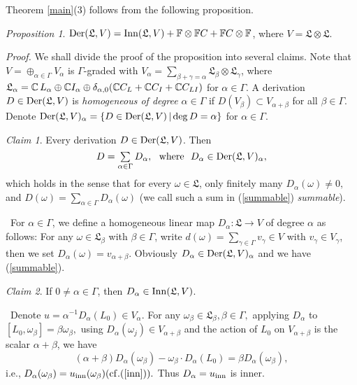 \documentclass{amsart}
\theoremstyle{definition}
\theoremstyle{remark}
\numberwithin{equation}{subsection}
\numberwithin{equation}{section}
\newtheorem{prop}[theo]{Proposition}
\newtheorem{clai}{Claim}
\begin{document}
Theorem \ref{main}(3) follows from the following proposition.

\begin{prop}
\label{lemma3} ${{\rm Der}}({\mathfrak{L}} ,V)={{\rm Inn}}({\mathfrak{L}}
,V)+\mathbb{F}\otimes \mathbb{F}C+\mathbb{F}C\otimes \mathbb{F}$,
where $V= {\mathfrak{L}} \otimes {\mathfrak{L}}$.
\end{prop}

{\noindent}{\it Proof.} We shall divide the proof of the proposition into
several claims. Note that $V=\oplus_{{\alpha}\in \Gamma}V_{\alpha}$ is
$\Gamma$-graded with $V_{\alpha}=\sum_{{\beta}+{\gamma}={\alpha}}
{\mathfrak{L}}_{\beta}\otimes{\mathfrak{L}}_{\gamma}$, where
${\mathfrak{L}}_{\alpha}={\mathbb{C}{{\scriptscriptstyle}\,}} L_{\alpha}\oplus \mathbb{C}I_\alpha\oplus
\delta_{\alpha,0}(\mathbb{C}C_L+\mathbb{C}C_I+\mathbb{C}C_{LI})$ for
${\alpha}\in \Gamma$. A derivation $D\in{{\rm Der}}({\mathfrak{L}} ,V)$ is {\it
homogeneous of degree ${\alpha}\in \Gamma$} if $D(V_{\beta}) \subset V_{{\alpha}
+{\beta}}$ for all ${\beta} \in \Gamma$. Denote ${{\rm Der}}({\mathfrak{L}} , V)_{\alpha} =
\{D\in {{\rm Der}}({\mathfrak{L}} , V) \,|\,{\rm deg\,}D ={\alpha}\}$ for ${\alpha}\in
\Gamma$.

\begin{clai}
\label{clai1} \rm Every derivation $D\in{{\rm Der}}({\mathfrak{L}} ,V)$.
Then
\begin{equation}
\label{summable} \mbox{$D = \sum\limits_{{\alpha} \in \Gamma} D_{\alpha} ,
\mbox{  \ where \ }D_{\alpha} \in {{\rm Der}}({\mathfrak{L}}, V)_{\alpha},$}
\end{equation}
which holds in the sense that for every $\omega \in {\mathfrak{L}}
$, only finitely many $D_{\alpha} (\omega)\neq 0,$ and $D(\omega) =
\sum_{{\alpha} \in \Gamma} D_{\alpha}(\omega)$ (we call such a sum in
(\ref{summable}) {\it summable}).
\end{clai}
\ \indent For ${\alpha}\in \Gamma$, we define a homogeneous linear map
$D_{\alpha} : {\mathfrak{L}}\rightarrow V$ of degree $\alpha$ as follows:
For any $\omega\in {\mathfrak{L}} _{\beta}$ with ${\beta}\in \Gamma$, write
$d(\omega)=\sum_{{\gamma}\in \Gamma}v_{\gamma}\in V$ with $v_{\gamma}\in V_{\gamma}$, then
we set $D_{\alpha}(\omega)=v_{{\alpha}+{\beta}}$. Obviously
$D_{\alpha}\in{{\rm Der}}({\mathfrak{L}} ,V)_{\alpha}$ and we have (\ref{summable}).
\begin{clai}
\label{clai2} \rm If $0\neq{\alpha}\in \Gamma$, then
$D_{\alpha}\in{{\rm Inn}}({\mathfrak{L}} ,V)$.
\end{clai}
\ \indent  Denote $u=\alpha^{-1}D_\alpha(L_0)\in V_\alpha.$ For any
$\omega_\beta\in \mathfrak{L}_\beta, \beta\in \Gamma,$  applying
$D_\alpha$ to $[L_0,\omega_\beta]=\beta \omega_\beta,$  using
$D_\alpha(\omega_j)\in V_{\alpha+\beta}$ and the action of $L_0$ on
$V_{\alpha+\beta}$ is the scalar $\alpha+\beta$, we have
\begin{equation}\label{equa-add-1}
({\alpha}+{\beta})D_{\alpha}(\omega_\beta) - \omega_\beta\cdot D_{\alpha}(L_0)={\beta}
D_{\alpha}(\omega_\beta),
\end{equation}
i.e., $D_{\alpha}(\omega_\beta)=u_{\rm
inn}(\omega_\beta)(\mathrm{cf}.(\ref{inn})).$ Thus $D_{\alpha}=u_{\rm
inn}$ is inner.
\end{document}
